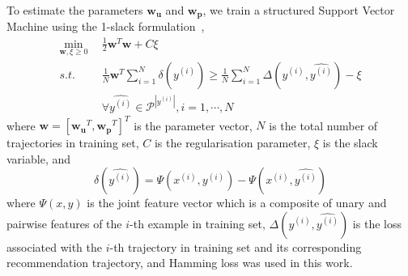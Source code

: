 To estimate the parameters $\mathbf{w_u}$ and $\mathbf{w_p}$, we train a structured Support Vector Machine
using the 1-slack formulation~\cite{ssvm09},
\begin{align*}
    \min_{\mathbf{w}, \xi \ge 0} ~~& \frac{1}{2} \mathbf{w}^T \mathbf{w} + C \xi \\
    s.t. ~~& \frac{1}{N} \mathbf{w}^T \sum_{i=1}^N \delta(\hat{y^{(i)}}) \ge
                  \frac{1}{N} \sum_{i=1}^N \Delta(y^{(i)}, \hat{y^{(i)}}) - \xi \\
         ~~& \forall \hat{y^{(i)}} \in \mathcal{P}^{|y^{(i)}|}, i = 1, \cdots, N
\end{align*}
where $\mathbf{w} = [\mathbf{w_u}^T, \mathbf{w_p}^T]^T$ is the parameter vector,
$N$ is the total number of trajectories in training set, $C$ is the regularisation parameter,
$\xi$ is the slack variable, and
\begin{displaymath}
    \delta(\hat{y^{(i)}}) = \Psi(x^{(i)}, y^{(i)}) - \Psi(x^{(i)}, \hat{y^{(i)}})
\end{displaymath}
where $\Psi(x, y)$ is the joint feature vector which is a composite of unary and pairwise features of the
$i$-th example in training set,
$\Delta(y^{(i)}, \hat{y^{(i)}})$ is the loss associated with the $i$-th trajectory in training set and
its corresponding recommendation trajectory, and Hamming loss was used in this work.
